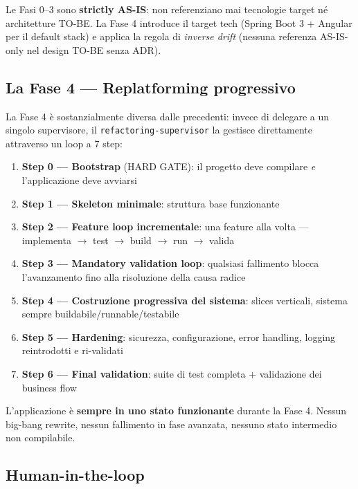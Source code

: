 \documentclass[12pt,a4paper,twoside]{book}
\begin{document}
Le Fasi 0--3 sono \textbf{strictly AS-IS}: non referenziano mai tecnologie target né architetture TO-BE. La Fase 4 introduce il target tech (Spring Boot 3 + Angular per il default stack) e applica la regola di \textit{inverse drift} (nessuna referenza AS-IS-only nel design TO-BE senza ADR).

\subsection{La Fase 4 — Replatforming progressivo}

La Fase 4 è sostanzialmente diversa dalle precedenti: invece di delegare a un singolo supervisore, il \texttt{refactoring-supervisor} la gestisce direttamente attraverso un loop a 7 step:

\begin{enumerate}
  \item \textbf{Step 0 — Bootstrap} (HARD GATE): il progetto deve compilare \textit{e} l'applicazione deve avviarsi
  \item \textbf{Step 1 — Skeleton minimale}: struttura base funzionante
  \item \textbf{Step 2 — Feature loop incrementale}: una feature alla volta — implementa $\rightarrow$ test $\rightarrow$ build $\rightarrow$ run $\rightarrow$ valida
  \item \textbf{Step 3 — Mandatory validation loop}: qualsiasi fallimento blocca l'avanzamento fino alla risoluzione della causa radice
  \item \textbf{Step 4 — Costruzione progressiva del sistema}: slices verticali, sistema sempre buildabile/runnable/testabile
  \item \textbf{Step 5 — Hardening}: sicurezza, configurazione, error handling, logging reintrodotti e ri-validati
  \item \textbf{Step 6 — Final validation}: suite di test completa + validazione dei business flow
\end{enumerate}

\begin{buonapratica}
L'applicazione è \textbf{sempre in uno stato funzionante} durante la Fase 4. Nessun big-bang rewrite, nessun fallimento in fase avanzata, nessuno stato intermedio non compilabile.
\end{buonapratica}

\subsection{Human-in-the-loop}
\end{document}
